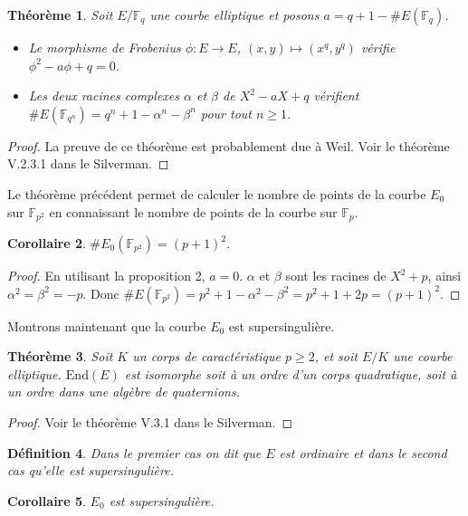\documentclass{article}
\theoremstyle{plain}%
\newtheorem{thm}{Théorème}[section]
\newtheorem{deff}[thm]{Définition}
\newtheorem{cor}[thm]{Corollaire}
\theoremstyle{definition}%
\newcommand{\F}{\mathbb{F}}
\begin{document}
\begin{thm}
  \label{weil}
  Soit $E/\F_q$ une courbe elliptique et posons $a = q + 1 - \#E(\F_q)$.
  \begin{itemize}
    \item Le morphisme de Frobenius $\phi \colon E \to E$, $(x, y) \mapsto (x^q, y^q)$ vérifie $\phi^2 - a\phi + q = 0$.
    \item Les deux racines complexes $\alpha$ et $\beta$ de $X^2 - aX + q$ vérifient $\#E(\F_{q^n}) = q^n + 1 - \alpha^n - \beta^n$ pour tout $n\ge1$. 
  \end{itemize}
\end{thm}

\begin{proof}
  La preuve de ce théorème est probablement due à Weil. Voir le théorème V.2.3.1 dans le Silverman.
\end{proof}

Le théorème précédent permet de calculer le nombre de points de la courbe $E_0$ sur $\F_{p^2}$ en connaissant le nombre de points de la courbe sur $\F_{p}$.

\begin{cor}
$\#E_0(\F_{p^2}) = (p+1)^2$.
\end{cor}

\begin{proof}
  En utilisant la proposition 2, $a = 0$. $\alpha$ et $\beta$ sont les racines de $X^2 + p$, ainsi $\alpha^2 = \beta^2 = -p$. Donc $\#E(\F_{p^2}) = p^2 + 1 - \alpha^2 - \beta^2 = p^2 + 1 + 2p = (p+1)^2$.
\end{proof}


Montrons maintenant que la courbe $E_0$ est supersingulière.

\begin{thm}
  Soit $K$ un corps de caractéristique $p\ge 2$, et soit $E/K$ une courbe elliptique. $\mathrm{End}(E)$ est isomorphe soit à un ordre d'un corps quadratique, soit à un ordre dans une algèbre de quaternions. 
\end{thm}

\begin{proof}
  Voir le théorème V.3.1 dans le Silverman.
\end{proof}

\begin{deff}
  Dans le premier cas on dit que $E$ est \textit{ordinaire} et dans le second cas qu'elle est \textit{supersingulière}.
\end{deff}

\begin{cor}
  $E_0$ est supersingulière.
\end{cor}
\end{document}
